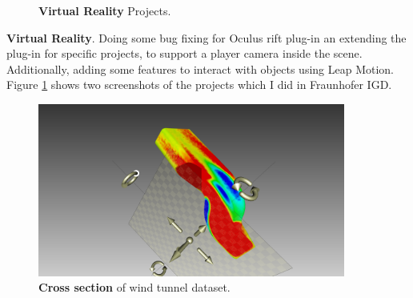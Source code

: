 \documentclass[]{report}
\begin{document}
\begin{figure}[!ht]
	\hfill
	\caption[Virtual Reality]{\textbf{Virtual Reality} Projects.}
	\label{fig:VR}
\end{figure}

\textbf{Virtual Reality}. Doing some bug fixing for Oculus rift plug-in an extending the plug-in for specific projects, to support a player camera inside the scene. Additionally, adding some features to interact with objects using Leap Motion. Figure \ref{fig:VR} shows two screenshots of the projects which I did in Fraunhofer IGD. 



\begin{figure}[!ht]
	\centering
	\includegraphics[width=0.90\textwidth]{./figs/crosssection.png}
	\caption[Cross section]{\textbf{Cross section} of wind tunnel dataset.}
	\label{fig:crossection}
\end{figure}
\end{document}
